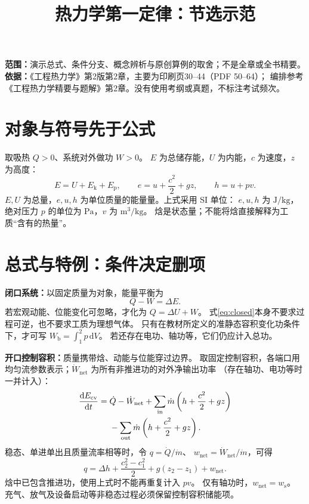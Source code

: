 \documentclass[UTF8,a4paper,11pt,fontset=fandol]{ctexart}
\title{热力学第一定律：节选示范}
\author{}\date{}
\begin{document}
\pagestyle{plain}
\maketitle\vspace{-2.8em}
\textbf{范围：}演示总式、条件分支、概念辨析与原创算例的取舍；不是全章或全书精要。
\textbf{依据：}《工程热力学》第2版第2章，主要为印刷页30--44（PDF 50--64）；
编排参考《工程热力学精要与题解》第2章。没有使用考纲或真题，不标注考试频次。

\section{对象与符号先于公式}
取吸热 $Q>0$、系统对外做功 $W>0$。
$E$ 为总储存能，$U$ 为内能，$c$ 为速度，$z$ 为高度：
\begin{equation}\label{eq:energy}
E=U+E_{\mathrm{k}}+E_{\mathrm{p}},\qquad
e=u+\frac{c^2}{2}+gz,\qquad h=u+pv.
\end{equation}
$E,U$ 为总量，$e,u,h$ 为单位质量的能量量。上式采用 SI 单位：
$e,u,h$ 为 $\mathrm{J/kg}$，绝对压力 $p$ 的单位为 $\mathrm{Pa}$，$v$ 为 $\mathrm{m^3/kg}$。
焓是状态量；不能将焓直接解释为工质“含有的热量”。

\section{总式与特例：条件决定删项}
\textbf{闭口系统：}以固定质量为对象，能量平衡为
\begin{equation}\label{eq:closed}
 Q-W=\Delta E.
\end{equation}
若宏观动能、位能变化可忽略，才化为 $Q=\Delta U+W$。
式\eqref{eq:closed}本身不要求过程可逆，也不要求工质为理想气体。
只有在教材所定义的准静态容积变化功条件下，才可写
$W_{\mathrm{b}}=\int_1^2 p\,\mathrm{d}V$。
若还存在电功、轴功等，它们仍应计入总功。

\textbf{开口控制容积：}质量携带焓、动能与位能穿过边界。
取固定控制容积，各端口用均匀流参数表示；$\dot W_{\mathrm{net}}$ 为所有非推进功的对外净输出功率
（存在轴功、电功等时一并计入）：
\begin{align}\label{eq:open}
\frac{\mathrm{d}E_{\mathrm{cv}}}{\mathrm{d}t}
={}&\dot Q-\dot W_{\mathrm{net}}
+\sum_{\mathrm{in}}\dot m\left(h+\frac{c^2}{2}+gz\right)\notag\\
&-\sum_{\mathrm{out}}\dot m\left(h+\frac{c^2}{2}+gz\right).
\end{align}
稳态、单进单出且质量流率相等时，令 $q=\dot Q/\dot m$、
$w_{\mathrm{net}}=\dot W_{\mathrm{net}}/\dot m$，可得
\begin{equation}\label{eq:steady}
 q=\Delta h+\frac{c_2^2-c_1^2}{2}+g(z_2-z_1)+w_{\mathrm{net}}.
\end{equation}
焓中已包含推进功，使用上式时不能再重复计入 $pv$。
仅有轴功时，$w_{\mathrm{net}}=w_{\mathrm{s}}$。
充气、放气及设备启动等非稳态过程必须保留控制容积储能项。
\end{document}
